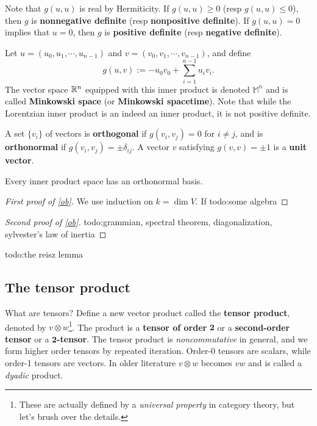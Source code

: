 Note that $g(u,u)$ is real by Hermiticity. If $g(u,u)\geq 0$ (resp $g(u,u)\leq 0$), then $g$ is \textbf{nonnegative definite} (resp \textbf{nonpositive definite}). If $g(u,u)=0$ implies that $u=0$, then $g $ is \textbf{positive definite} (resp \textbf{negative definite}).
\begin{example}
    Let $u=(u_0,u_1,\cdots ,u_{n-1})$ and $v=(v_0,v_1,\cdots ,v_{n-1})$, and define \[
        g(u,v):=-u_0v_0+\sum_{i=1}^{n-1} u_i v_i .
    \] The vector space $\mathbb{R}^n $ equipped with this inner product is denoted $\mathbb M^n $ and is called \textbf{Minkowski space} (or \textbf{Minkowski spacetime}). Note that while the Lorentzian inner product is an indeed an inner product, it is not positive definite.
\end{example}
A set $\{v_i \} $ of vectors is \textbf{orthogonal} if $g(v_i ,v_j )=0$ for $i\neq j$, and is \textbf{orthonormal} if $g(v_i ,v_j )=\pm \delta_{ij}$. A vector $v$ satisfying $g(v,v)=\pm 1$ is a \textbf{unit vector}.
\begin{theorem}\label{ob}  
    Every inner product space has an orthonormal basis.
\end{theorem}
\begin{proof}[First proof of \cref{ob}]
   We use induction on $k=\dim V$. If {\color{red}todo:some algebra}  
\end{proof}
\begin{proof}[Second proof of \cref{ob}]
   {\color{red}todo:grammian, spectral theorem, diagonalization, sylvester's law of inertia}  
\end{proof}
{\color{red}todo:the reisz lemma} 

\subsection{The tensor product}
What are tensors? Define a new vector product called the \textbf{tensor product}, denoted by $v\otimes w$\footnote{These are actually defined by a \emph{universal property} in category theory, but let's brush over the details.}. The product is a \textbf{tensor of order} $\mathbf 2$ or a \textbf{second-order tensor} or a $\mathbf 2$\textbf{-tensor}. The tensor product is \emph{noncommutative} in general, and we form higher order tensors by repeated iteration. Order-0 tensors are scalars, while order-1 tensors are vectors. In older literature $v\otimes w$ becomes $vw$ and is called a \emph{dyadic} product. 

